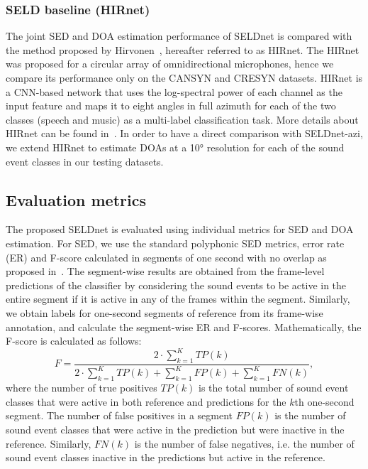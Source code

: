 \documentclass[journal]{IEEEtran}
\begin{document}
\subsubsection{SELD baseline (HIRnet)}
\label{sssec:seldbaseline}
The joint SED and DOA estimation performance of SELDnet is compared with the method proposed by Hirvonen~\cite{Hirvonen2015}, hereafter referred to as HIRnet. The HIRnet was proposed for a circular array of omnidirectional microphones, hence we compare its performance only on the CANSYN and CRESYN datasets. HIRnet is a CNN-based network that uses the log-spectral power of each channel as the input feature and maps it to eight angles in full azimuth for each of the two classes (speech and music) as a multi-label classification task. More details about HIRnet can be found in~\cite{Hirvonen2015}. In order to have a direct comparison with SELDnet-azi, we extend HIRnet to estimate DOAs at a \ang{10} resolution for each of the sound event classes in our testing datasets.


\subsection{Evaluation metrics}
\label{ssec:metric}
The proposed SELDnet is evaluated using individual metrics for SED and DOA estimation. For SED, we use the standard polyphonic SED metrics, error rate (ER) and F-score calculated in segments of one second with no overlap as proposed in~\cite{metrics, CASSE:2018}. The segment-wise results are obtained from the frame-level predictions of the classifier by considering the sound events to be active in the entire segment if it is active in any of the frames within the segment. Similarly, we obtain labels for one-second segments of reference from its frame-wise annotation, and calculate the segment-wise ER and F-scores. Mathematically, the F-score is calculated as follows:
\begin{equation}
F = \frac{2 \cdot \sum_{k=1}^{K} TP(k)}{2 \cdot \sum_{k=1}^{K}TP(k)+ \sum_{k=1}^{K}FP(k)+ \sum_{k=1}^{K}FN(k)},
\label{Eqn:F}
\end{equation}
%
where the number of true positives $TP(k)$ is the total number of sound event classes that were active in both reference and predictions for the $k$th one-second segment. The number of false positives in a segment $FP(k)$ is the number of sound event classes that were active in the prediction but were inactive in the reference. Similarly, $FN(k)$ is the number of false negatives, i.e. the number of sound event classes inactive in the predictions but active in the reference.
\end{document}
